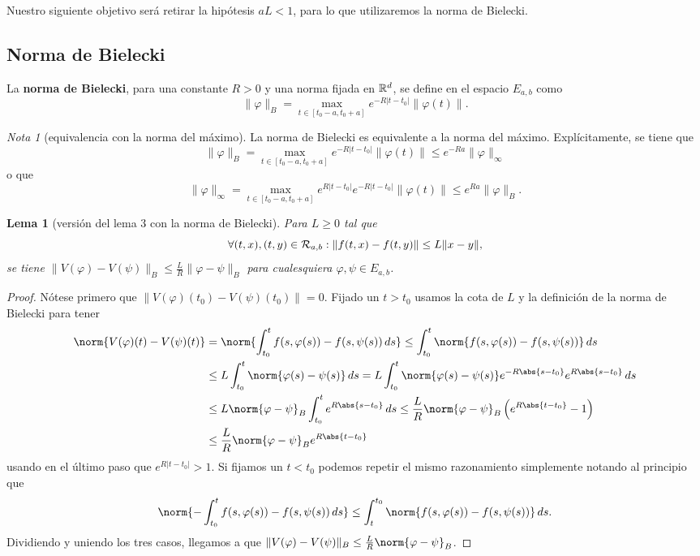 \documentclass[11pt]{article}
\theoremstyle{plain}
\newtheorem{lemma}{Lema}
\theoremstyle{definition}
\theoremstyle{remark}
\newtheorem{remark}{Nota}
\begin{document}
Nuestro siguiente objetivo será retirar la hipótesis $aL < 1$, para lo que
utilizaremos la norma de Bielecki.

\subsection{Norma de Bielecki}

La \textbf{norma de Bielecki}, para una constante \(R > 0\) y una norma fijada
en $\mathbb{R}^d$, se define en el espacio \(E_{a,b}\) como
\[\|\varphi\|_B = \max_{t \in [t_0-a,t_0+a]} e^{-R|t-t_0|}\|\varphi(t)\|.\]

\begin{remark}[equivalencia con la norma del máximo]
  La norma de Bielecki es equivalente a la norma del máximo. Explícitamente,
  se tiene que
  \[
    \|\varphi\|_B = \max_{t \in [t_0-a,t_0+a]} e^{-R|t-t_0|} \|\varphi(t)\| \leq
     e^{-Ra} \|\varphi\|_\infty
   \]
  o que
  \[
   \|\varphi\|_\infty =  \max_{t \in [t_0-a,t_0+a]} e^{R|t-t_0|}e^{-R|t-t_0|} \|\varphi(t)\| \leq
   e^{Ra}\|\varphi\|_B.
  \]
\end{remark}

\begin{lemma}[versión del lema 3 con la norma de Bielecki]\label{lema-4-contr}
  Para \(L \geq 0\) tal que
  \[
    \forall (t,x),(t,y) \in {{\cal{R}}}_{a,b} : \| f(t,x) - f(t,y) \| \leq L\|x-y\|,
  \]
  se tiene \(\|V(\varphi)-V(\psi)\|_B \leq \frac{L}{R} \|\varphi - \psi\|_B\)
  para cualesquiera $\varphi,\psi \in E_{a,b}$.
\end{lemma}
\begin{proof}
Nótese primero que $\|V(\varphi)(t_0) - V(\psi)(t_0)\| = 0$. Fijado un $t > t_0$
usamos la cota de $L$ y la definición de la norma de Bielecki para tener
\[\begin{aligned}
\norm{V(\varphi)(t) - V(\psi)(t)} &=
\norm{\int_{t_0}^t f(s,\varphi(s)) - f(s,\psi(s))\,ds} \leq
\int_{t_0}^t \norm{f(s,\varphi(s)) - f(s,\psi(s))}\,ds \\&\leq
L \int_{t_0}^t \norm{\varphi(s) - \psi(s)}\,ds =
L \int_{t_0}^t \norm{\varphi(s) - \psi(s)} e^{-R\abs{s-t_0}}e^{R\abs{s-t_0}}\, ds \\&\leq
L \norm{\varphi - \psi}_{B} \int_{t_0}^t e^{R\abs{s-t_0}}\,ds \leq
\frac{L}{R} \norm{\varphi - \psi}_{B} \left(e^{R\abs{t-t_0}} - 1\right) \\&\leq
\frac{L}{R} \norm{\varphi - \psi}_{B} e^{R\abs{t-t_0}}
\end{aligned}\]
usando en el último paso que $e^{R|t-t_0|} > 1$. Si fijamos un $t < t_0$
podemos repetir el mismo razonamiento simplemente notando al principio que
\[
\norm{- \int_{t_0}^t f(s,\varphi(s)) - f(s,\psi(s))\,ds} \leq
\int_{t}^{t_0} \norm{f(s,\varphi(s)) - f(s,\psi(s))}\,ds.
\]
Dividiendo y uniendo los tres casos, llegamos a que
$\|V(\varphi) - V(\psi)\|_{B} \leq \frac{L}{R} \norm{\varphi - \psi}_{B}$.
\end{proof}
\end{document}
